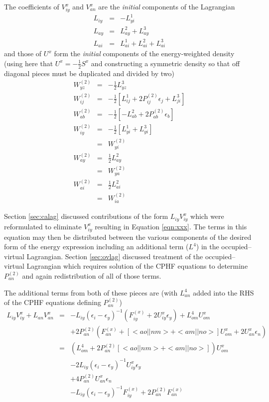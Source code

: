 \documentclass[fleqn,12pt]{article}
\newcommand{\half}{\frac{1}{2}}
\newcommand{\bra}{<\!}
\newcommand{\ket}{\!>}
\newcommand{\Ptwo}{P^{(2)}}
\newcommand{\Wtwo}{W^{(2)}}
\newcommand{\Fx}{F^{(x)}}
\begin{document}
The coefficients of $V^x_{iy}$ and $V^x_{an}$ are the {\em initial}
components of the Lagrangian
\begin{eqnarray}
  L_{iy} & = & -L^1_{yi} \\
  L_{ay} & = & L^2_{ay} + L^3_{ay} \\
  L_{ai} & = & L^1_{ai} + L^2_{ai} + L^3_{ai} 
\end{eqnarray}
and those of $U^x$ form the {\em initial} components of the
energy-weighted density (using here that $U^x = -\half S^x$
and constructing a symmetric density so that off diagonal pieces must
be duplicated and divided by two)
\begin{eqnarray}
  \Wtwo_{yz} & = & -\half L^3_{yz} \\
  \Wtwo_{ij} & = & -\half \left[ L^1_{ij} + 2 \Ptwo_{ij} \epsilon_j +
    L^3_{ji} \right] \\
  \Wtwo_{ab} & = & -\half \left[ -L^2_{ab} + 2 \Ptwo_{ab} \epsilon_b
  \right] \\
  \Wtwo_{iy} & = & -\half\left[ L^1_{yi} + L^3_{yi} \right] \\
         & = & \Wtwo_{yi} \\
  \Wtwo_{ay} & = & \half L^2_{ay} \\
         & = & \Wtwo_{ya} \\
  \Wtwo_{ai} & = & \half L^2_{ai} \\
         & = & \Wtwo_{ia}
\end{eqnarray}

Section \ref{sec:calag} discussed contributions of the form
$L_{iy}V^x_{iy}$ which were reformulated to eliminate $V^x_{iy}$
resulting in Equation \ref{eqn:xxx}.  The terms in this equation may
then be distributed between the various components of the desired form
of the energy expression including an additional term ($L^4$) in the
occupied--virtual Lagrangian.  Section \ref{sec:ovlag} discussed
treatment of the occupied--virtual Lagrangian which requires solution
of the CPHF equations to determine $\Ptwo_{an}$ and again
redistribution of all of those terms.  

The additional terms from both of these pieces are (with $L^4_{an}$
added into the RHS of the CPHF equations defining $\Ptwo_{an}$)
\begin{eqnarray}
  L_{iy}V^x_{iy} + L_{an}V^x_{an} & = & 
   - L_{iy} \left( \epsilon_i -  \epsilon_y  \right)^{-1} 
     \left(\Fx_{iy} + 2 U^x_{iy}  \epsilon_y \right)
    + L^4_{om} U^x_{om}  \nonumber \\
  & &  + 2 \Ptwo_{an} \left(\Fx_{an} +\left[ \bra ao||nm \ket
    + \bra am||no \ket \right] U^x_{om} + 2 U^x_{an} \epsilon_n
      \right) \\
  & = & \left( L^4_{om}  +2 \Ptwo_{an} \left[ \bra ao||nm \ket
    + \bra am||no \ket \right] \right) U^x_{om}  \nonumber \\
  & & - 2 L_{iy} \left( \epsilon_i -  \epsilon_y  \right)^{-1} 
      U^x_{iy}  \epsilon_y \nonumber \\
  & &   + 4 \Ptwo_{an} U^x_{an} \epsilon_n \nonumber \\
  & &   - L_{iy} \left( \epsilon_i -  \epsilon_y  \right)^{-1}
  \Fx_{iy} 
  + 2 \Ptwo_{an} \Fx_{an} \label{eqn:addtnl}
\end{eqnarray}
\end{document}
